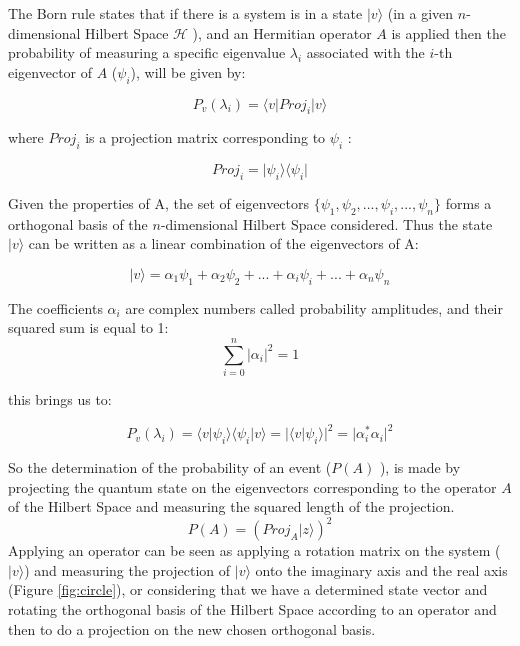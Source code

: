 The Born rule states that if there is a system is in a state $\vert v \rangle$  (in a given $n$-dimensional Hilbert Space $\mathcal{H}$ ), and an Hermitian operator $A$ is applied then the probability of measuring a specific eigenvalue $\lambda_{i}$ associated with the $i$-th eigenvector of $A$ ($\psi_{i}$), will be given by\cite{VanRijsbergen2004}: 


\begin{equation}
\label{eq_born_rule}
P_{v}(\lambda_{i}) = \langle v\vert Proj_{i}\vert v\rangle
\end{equation}

where $Proj_{i}$ is a projection matrix corresponding to $\psi_{i}$ :

 \begin{equation}
\label{eq_born_rule_1}
Proj_{i} = \vert\psi_{i}\rangle \langle \psi_{i}\vert
\end{equation}

Given the properties of A, the set of eigenvectors $\{ \psi_{1}, \psi_{2}, ..., \psi_{i},..., \psi_{n}\}$ forms a orthogonal basis of the $n$-dimensional Hilbert Space considered. Thus the state $\vert v \rangle$
can be written as a linear combination of the eigenvectors of A:

 \begin{equation}
\label{eq_born_rule_lala}
\vert v \rangle = \alpha_{1}\psi_{1}+ \alpha_{2}\psi_{2}+ ...+\alpha_{i}\psi_{i}+...+\alpha_{n}\psi_{n}
\end{equation}

The coefficients $\alpha_{i}$ are complex numbers called probability amplitudes, and their squared sum is equal to 1: 
\begin{equation}
\sum_{i=0}^{n} \vert \alpha_{i}\vert^{2} = 1
\end{equation}

this brings us to: 

\begin{equation}
\label{eq_born_rule_2}
P_{v}(\lambda_{i}) =\langle v\vert\psi_{i}\rangle\langle\psi_{i}\vert v\rangle=\vert\langle v\vert\psi_{i}\rangle \vert^{2} = \vert \alpha_{i}^{*}\alpha_{i}\vert^{2}
\end{equation}

So the determination of the probability of an event ($P(A)$ ),
is made by projecting the quantum state on the eigenvectors corresponding to the operator $A$ of the
Hilbert Space and measuring the squared length of the projection.\cite{Trueblood}
\begin{equation}
P(A)=\left(Proj_{A}\vert z\rangle\right)^{2}
\end{equation}
Applying an operator can be seen as applying a rotation matrix on the system ($\vert v \rangle$) and measuring the projection of $\vert v \rangle$ onto the imaginary axis and the real axis (Figure \ref{fig:circle}), or considering that we have a determined state vector and rotating the orthogonal basis of the Hilbert Space according to an operator and then to do a projection on the new chosen orthogonal basis.

